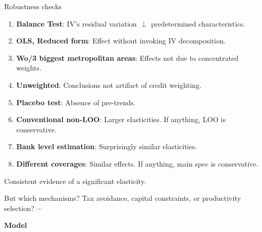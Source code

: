 \documentclass[aspectratio=169]{beamer}
\begin{document}
\begin{frame}{Robustness checks}\label{robustness}

\begin{enumerate}
    \item \textbf{Balance Test}: IV's residual variation $\perp$ predetermined characteristics. \hyperlink{balance}{}
    \vspace{1mm}
    \pause
    \item \textbf{OLS, Reduced form}: Effect without invoking IV decomposition. \hyperlink{ols}{}
    \vspace{1mm}
    \pause
    \item \textbf{Wo/3 biggest metropolitan areas}: Effects not due to concentrated weights. \hyperlink{womet}{}
    \vspace{1mm}
    \pause
    \item \textbf{Unweighted}: Conclusions not artifact of credit weighting. \hyperlink{unweighted}{}
    \vspace{1mm}
    \pause
    \item \textbf{Placebo test}: Absence of pre-trends. \hyperlink{placebo}{}
    \vspace{1mm}
    \pause
    \item \textbf{Conventional non-LOO}: Larger elasticities. If anything, LOO is conservative. \hyperlink{nonloo}{}
    \vspace{1mm}
    \pause
    \item \textbf{Bank level estimation}: Surprisingly similar elasticities. \hyperlink{banklevel}{}
    \vspace{1mm}
    \pause
    \item \textbf{Different coverages}: Similar effects. If anything, main spec is conservative. \hyperlink{coverage}{}
\end{enumerate}

\begin{center}
    \Large Consistent evidence of a significant elasticity.
\end{center}
\pause

But which mechanisms? Tax avoidance, capital constraints, or productivity selection? $\cdots$ 

\begin{center}
    \Large \textbf{Model}
\end{center}

\end{frame}
\end{document}
